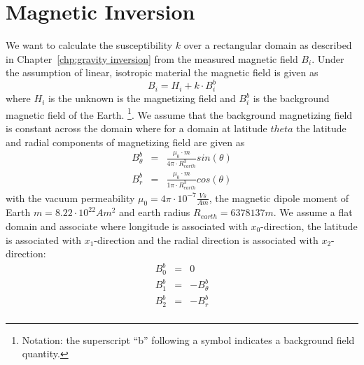 
%
%
%


\chapter{Magnetic Inversion}\label{chp:magnetic inversion}

We want to calculate the susceptibility $k$ over a rectangular domain as described in Chapter~\ref{chp:gravity inversion} from 
the measured magnetic field $B_i$. Under the assumption of linear, isotropic material the magnetic field is 
given as 
\begin{equation}\label{EQU:Hb}
B_i = H_i + k \cdot B^b_i 
\end{equation}
where  $H_i$ is the unknown is the magnetizing field and
$B^b_i$ is the background  magnetic field of the Earth.
\footnote{Notation: the superscript ``b'' following a symbol indicates 
a background field quantity.}. We assume that the background  magnetizing field is constant across the domain 
where for a domain at latitude $theta$ the latitude and radial components of magnetizing field are given as  
\begin{equation}\label{EQU:Hb 2}
\begin{array}{rcl}
B^b_{\theta}  & = & \displaystyle{ \frac{\mu_0 \cdot m}{4 \pi \cdot R_{earth}^3} sin(\theta) }  \\
B^b_r & = & \displaystyle{ \frac{\mu_0 \cdot m}{1 \pi \cdot R_{earth}^3} cos(\theta) }
\end{array}
\end{equation}
with the vacuum permeability $\mu_0 = 4 \pi \cdot 10^{-7} \frac{Vs}{Am}$, 
the magnetic dipole moment of Earth $m= 8.22 \cdot 10^22 Am^2$ and earth radius $R_{earth}= 6378137m$. We assume a flat domain
and associate where longitude is associated with $x_0$-direction,
the latitude is associated with $x_1$-direction and the radial direction is associated with $x_2$-direction:
\begin{equation}\label{EQU:Hb 3}
\begin{array}{rcl}
B^b_0  & = & 0 \\
B^b_1  & = & -B^b_{\theta} \\
B^b_2  & = & -B^b_r \\
\end{array}
\end{equation}
